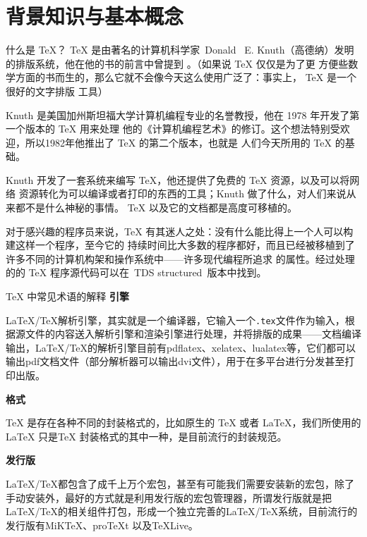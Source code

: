 \section{背景知识与基本概念}

\begin{faq}{什么是 \TeX{}？}
  \TeX{} 是由著名的计算机科学家 Donald~ E. Knuth（高德纳）发明的排版系统，他在他的书的前言中曾提到%
  。（如果说 \TeX{} 仅仅是为了更
  方便些数学方面的书而生的，那么它就不会像今天这么使用广泛了：事实上， \TeX{} 是一个很好的文字排版
  工具）

  Knuth 是美国加州斯坦福大学计算机编程专业的名誉教授，他在 1978 年开发了第一个版本的 \TeX{} 用来处理
  他的《计算机编程艺术》的修订。这个想法特别受欢迎，所以1982年他推出了 \TeX{} 的第二个版本，也就是
  人们今天所用的 \TeX{} 的基础。

  Knuth 开发了一套系统来编写 \TeX{}，他还提供了免费的 \TeX{} 资源，以及可以将网络
  资源转化为可以编译或者打印的东西的工具；Knuth 做了什么，对人们来说从来都不是什么神秘的事情。
  \TeX{} 以及它的文档都是高度可移植的。

  对于感兴趣的程序员来说，\TeX{} 有其迷人之处：没有什么能比得上一个人可以构建这样一个程序，至今它的
  持续时间比大多数的程序都好，而且已经被移植到了许多不同的计算机构架和操作系统中——许多现代编程所追求
  的属性。经过处理的的 \TeX{} 程序源代码可以在 TDS structured 版本中找到。

\end{faq}

\begin{faq}{\TeX{} 中常见术语的解释}
\textbf{引擎}
  
\LaTeX/\TeX{}解析引擎，其实就是一个编译器，它输入一个\verb|.tex|文件作为输入，根据源文件的内容送入解析引擎和渲染引擎进行处理，并将排版的成果——文档编译输出，\LaTeX/\TeX{}的解析引擎目前有pdflatex、xelatex、lualatex等，它们都可以输出pdf文档文件（部分解析器可以输出dvi文件），用于在多平台进行分发甚至打印出版。

\textbf{格式}

\TeX{} 是存在各种不同的封装格式的，比如原生的 \TeX{} 或者 \LaTeX{}，我们所使用的 \LaTeX{} 只是\TeX{} 封装格式的其中一种，是目前流行的封装规范。

\textbf{发行版}

\LaTeX/\TeX{}都包含了成千上万个宏包，甚至有可能我们需要安装新的宏包，除了手动安装外，最好的方式就是利用发行版的宏包管理器，所谓发行版就是把\LaTeX/\TeX{}的相关组件打包，形成一个独立完善的\LaTeX/\TeX{}系统，目前流行的发行版有MiKTeX、proTeXt 以及TeXLive。
\end{faq}


\begin{faq}{}

\end{faq}
